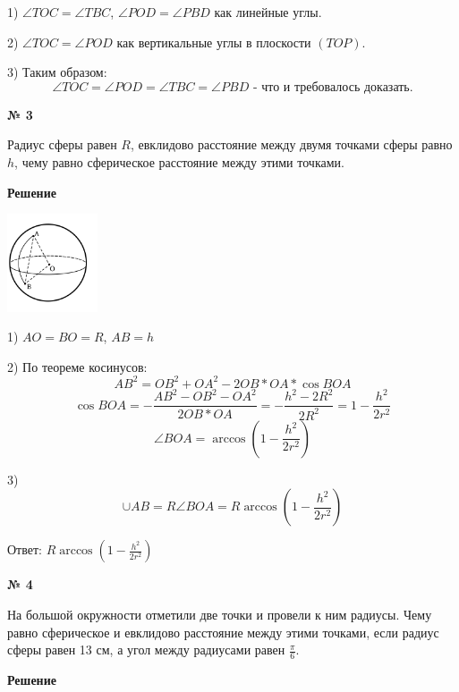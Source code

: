     1) $\angle TOC = \angle TBC$, $\angle POD = \angle PBD$ как линейные углы.

    2) $\angle TOC = \angle POD$ как вертикальные углы в плоскости $(TOP)$.

    3) Таким образом:
    \[
        \angle TOC = \angle POD = \angle TBC = \angle PBD \text{ - что и требовалось доказать.}
    \]

    \begin{center}
        \textbf{№ 3}
    \end{center}

    Радиус сферы равен $R$, евклидово расстояние между двумя точками сферы равно $h$,
    чему равно сферическое расстояние между этими точками.

    \textbf{Решение}\\

    \begin{center}
        \includegraphics[width=0.2\textwidth]{images/img6}\\
    \end{center}

    1) $AO = BO = R$, $AB = h$

    2) По теореме косинусов:
    \[
        AB ^ 2 = OB ^ 2 + OA ^ 2 - 2OB*OA*\cos BOA
    \]
    \[
        \cos BOA = -\frac{AB^2 - OB^2 - OA^2}{2OB*OA} = -\frac{h^2 - 2R^2}{2R^2} = 1 - \frac{h^2}{2r^2}
    \]
    \[
        \angle BOA = \arccos \left(1 - \frac{h^2}{2r^2}\right)
    \]

    3)
    \[
        \cup AB = R\angle BOA = R \arccos \left(1 - \frac{h^2}{2r^2}\right)
    \]

    Ответ: $R \arccos \left(1 - \frac{h^2}{2r^2}\right)$

    \begin{center}
        \textbf{№ 4}
    \end{center}

    На большой окружности отметили две точки и провели к ним радиусы.
    Чему равно сферическое и евклидово расстояние между этими точками, если радиус сферы равен 13 см,
    а угол между радиусами равен $\frac{\pi}{6}$.

    \textbf{Решение}\\

